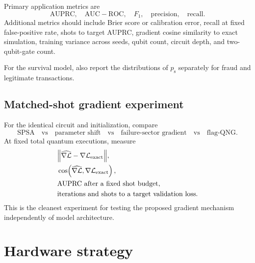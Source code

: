 \documentclass[11pt,a4paper]{article}
\newcommand{\psucc}{p_{\mathrm{s}}}
\begin{document}
Primary application metrics are
\begin{equation}
\mathrm{AUPRC},\quad
\mathrm{AUC\!\!\!-\!ROC},\quad
F_1,\quad
\mathrm{precision},\quad
\mathrm{recall}.
\end{equation}
Additional metrics should include Brier score or calibration error, recall at fixed false-positive rate, shots to target AUPRC, gradient cosine similarity to exact simulation, training variance across seeds, qubit count, circuit depth, and two-qubit-gate count.

For the survival model, also report the distributions of $\psucc$ separately for fraud and legitimate transactions.

\subsection{Matched-shot gradient experiment}

For the identical circuit and initialization, compare
\begin{equation}
\text{SPSA}
\quad\text{vs}\quad
\text{parameter shift}
\quad\text{vs}\quad
\text{failure-sector gradient}
\quad\text{vs}\quad
\text{flag-QNG}.
\end{equation}
At fixed total quantum executions, measure
\begin{align}
&\norm{\widehat{\nabla\mathcal L}-\nabla\mathcal L_{\mathrm{exact}}},\\
&\cos\!\left(\widehat{\nabla\mathcal L},\nabla\mathcal L_{\mathrm{exact}}\right),\\
&\text{AUPRC after a fixed shot budget},\\
&\text{iterations and shots to a target validation loss}.
\end{align}
This is the cleanest experiment for testing the proposed gradient mechanism independently of model architecture.

\section{Hardware strategy}
\end{document}
